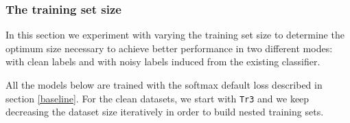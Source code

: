 \documentclass[a4paper]{article}
\begin{document}
        \subsubsection{The training set size}
            In this section we experiment with varying the training set size to determine the optimum size necessary to achieve better performance in two different modes: with clean labels and with noisy labels induced from the existing classifier.

            All the models below are trained with the softmax default loss described in section \ref{baseline}. For the clean datasets, we start with \texttt{Tr3} and we keep decreasing the dataset size iteratively in order to build nested training sets.
\end{document}
